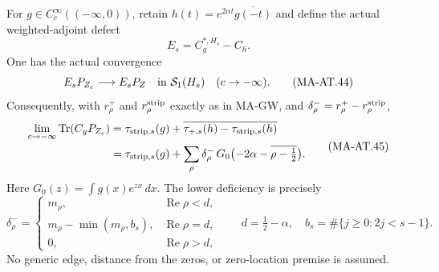 For \(g\in C_c^\infty((-\infty,0))\), retain
\(h(t)=e^{2\alpha t}\overline{g(-t)}\) and define the actual
weighted-adjoint defect
\[
                         E_s=C_g^{*,H_s}-C_h .
 \tag{MA-AT.43}
\]
One has the actual convergence
\[
                       E_sP_{Z_c}\longrightarrow E_sP_Z
                           \quad\hbox{in }\mathcal S_1(H_s)
                              \quad(c\to-\infty).
 \tag{MA-AT.44}
\]
Consequently, with \(r_\rho^+\) and
\(r_\rho^{\rm strip}\) exactly as in MA-GW, and
\(\delta_\rho^-=r_\rho^+-r_\rho^{\rm strip}\),
\[
 \begin{split}
 \lim_{c\to-\infty}\operatorname{Tr}(C_gP_{Z_c})
   &=
     \tau_{{\rm strip},s}(g)
       +\overline{\tau_{+,s}(h)-\tau_{{\rm strip},s}(h)}\\
   &=
     \tau_{{\rm strip},s}(g)
       +\sum_\rho\delta_\rho^-\,
          G_0\bigl(-2\alpha-\overline{\rho-\tfrac12}\bigr).
 \end{split}
 \tag{MA-AT.45}
\]
Here \(G_0(z)=\int g(x)e^{zx}\,dx\).
The lower deficiency is precisely
\[
 \delta_\rho^-=
 \begin{cases}
 m_\rho,&\operatorname{Re}\rho<d,\\
 m_\rho-\min(m_\rho,b_s),&\operatorname{Re}\rho=d,\\
 0,&\operatorname{Re}\rho>d,
 \end{cases}
 \qquad
 d=\tfrac12-\alpha,\quad
 b_s=\#\{j\ge0:2j<s-1\}.
 \tag{MA-AT.46}
\]
No generic edge, distance from the zeros, or zero-location premise
is assumed.

